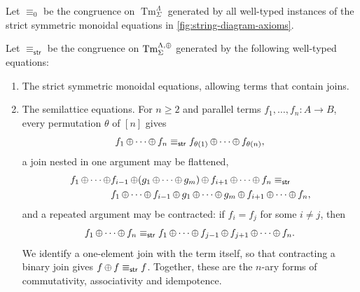 \begin{definition}
\label{def:lambda-structural-congruences}
Let $\equiv_0$ be the congruence on
$\operatorname{Tm}^{\Lambda}_{\Sigma}$ generated by all well-typed
instances of the strict symmetric monoidal equations in
\cref{fig:string-diagram-axioms}.

Let $\equiv_{\mathsf{str}}$ be the congruence on
$\operatorname{Tm}^{\Lambda,\operatorname{\oplus}}_{\Sigma}$ generated by the following
well-typed equations:
\begin{enumerate}
  \item The strict symmetric monoidal equations, allowing terms that
  contain joins.

  \item The semilattice equations. For $n\geq2$ and parallel terms
  $f_1,\ldots,f_n:A\to B$, every permutation $\theta$ of $[n]$ gives
  \[
    f_1 \operatorname{\oplus} \cdots \operatorname{\oplus} f_n
    \equiv_{\mathsf{str}}
    f_{\theta(1)} \operatorname{\oplus} \cdots \operatorname{\oplus} f_{\theta(n)},
  \]
  a join nested in one argument may be flattened,
  \begin{align*}
    f_1 \operatorname{\oplus} \cdots \operatorname{\oplus} &f_{i-1}
    \operatorname{\oplus} (g_1 \operatorname{\oplus} \cdots \operatorname{\oplus} g_m)
    \operatorname{\oplus} f_{i+1} \operatorname{\oplus} \cdots \operatorname{\oplus} f_n
    \equiv_{\mathsf{str}}\\
    &f_1 \operatorname{\oplus} \cdots \operatorname{\oplus} f_{i-1}
    \operatorname{\oplus} g_1 \operatorname{\oplus} \cdots \operatorname{\oplus} g_m
    \operatorname{\oplus} f_{i+1} \operatorname{\oplus} \cdots \operatorname{\oplus} f_n,
  \end{align*}
  and a repeated argument may be contracted: if $f_i=f_j$ for some
  $i\neq j$, then
  \[
    f_1 \operatorname{\oplus} \cdots \operatorname{\oplus} f_n
    \equiv_{\mathsf{str}}
    f_1 \operatorname{\oplus} \cdots \operatorname{\oplus} f_{j-1}
    \operatorname{\oplus} f_{j+1} \operatorname{\oplus} \cdots \operatorname{\oplus} f_n .
  \]
  We identify a one-element join with the term itself, so that contracting a binary join gives
  $f\operatorname{\oplus} f\equiv_{\mathsf{str}}f$. Together, these are the $n$-ary
  forms of commutativity, associativity and idempotence. 


\end{enumerate}
\end{definition}

